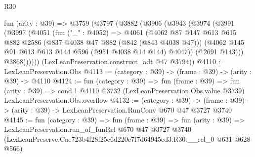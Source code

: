 \begin{lexlean}{R30}
\begin{coremodule}
  fun (arity : @39) =>
  @3759
    (@3797
      (@3882
        (@3906
          (@3943
            (@3974
              (@3991
                (@3997
                  (@4051
                    (fun ("_" : @4052) =>
                    @4061
                      (@4062
                        @87
                        @147
                        @613
                        @615
                        @882
                        @2586
                        (@837 @4038 @47 @882 (@842 (@843 @4038 @47)))
                        (@4062 @145 @91 @613 @613 @144 @596 (@951 @4038 @14 @144) @4047))
                      (@2691 @143)))
                  @3868))))))
      (LexLeanPreservation.construct_adt @47 @3794))
@4110 := LexLeanPreservation.Obs
@4113 := (category : @39) -> (frame : @39) -> (arity : @39) -> @4110
@4124 := fun (category : @39) =>
  fun (frame : @39) =>
  fun (arity : @39) =>
  cond.{1} @4110 @3732 (LexLeanPreservation.Obs.value @3739) LexLeanPreservation.Obs.overflow
@4132 := (category : @39) ->
  (frame : @39) -> (arity : @39) -> LexLeanPreservation.RunConv @670 @47 @3727 @3740
@4145 := fun (category : @39) =>
  fun (frame : @39) =>
  fun (arity : @39) =>
  LexLeanPreservation.run_of_funRel
    @670
    @47
    @3727
    @3740
    (LexLeanPreserve.Cae723b4f28f25c6d220e7f7d64945ed3.R30.__rel_0 @631 @628 @566)
\end{coremodule}
\end{lexlean}
